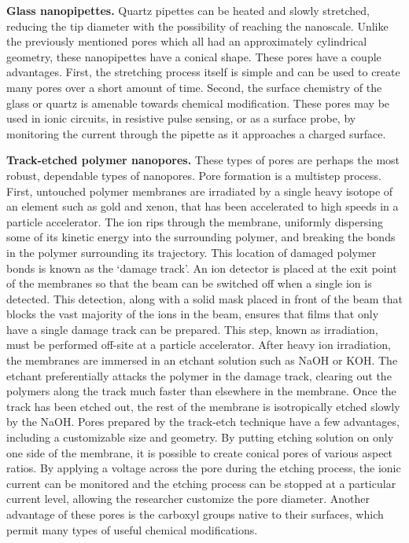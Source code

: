 			\textbf{Glass nanopipettes.} Quartz pipettes can be heated and slowly stretched, reducing the tip diameter with the possibility of reaching the nanoscale. Unlike the previously mentioned pores which all had an approximately cylindrical geometry, these nanopipettes have a conical shape. These pores have a couple advantages. First, the stretching process itself is simple and can be used to create many pores over a short amount of time. Second, the surface chemistry of the glass or quartz is amenable towards chemical modification. These pores may be used in ionic circuits, in resistive pulse sensing, or as a surface probe, by monitoring the current through the pipette as it approaches a charged surface.

			\textbf{Track-etched polymer nanopores.} These types of pores are perhaps the most robust, dependable types of nanopores. Pore formation is a multistep process. First, untouched polymer membranes are irradiated by a single heavy isotope of an element such as gold and xenon, that has been accelerated to high speeds in a particle accelerator. The ion rips through the membrane, uniformly dispersing some of its kinetic energy into the surrounding polymer, and breaking the bonds in the polymer surrounding its trajectory. This location of damaged polymer bonds is known as the `damage track'. An ion detector is placed at the exit point of the membranes so that the beam can be switched off when a single ion is detected. This detection, along with a solid mask placed in front of the beam that blocks the vast majority of the ions in the beam, ensures that films that only have a single damage track can be prepared. This step, known as irradiation, must be performed off-site at a particle accelerator. After heavy ion irradiation, the membranes are immersed in an etchant solution such as NaOH or KOH. The etchant preferentially attacks the polymer in the damage track, clearing out the polymers along the track much faster than elsewhere in the membrane. Once the track has been etched out, the rest of the membrane is isotropically etched slowly by the NaOH. Pores prepared by the track-etch technique have a few advantages, including a customizable size and geometry. By putting etching solution on only one side of the membrane, it is possible to create conical pores of various aspect ratios. By applying a voltage across the pore during the etching process, the ionic current can be monitored and the etching process can be stopped at a particular current level, allowing the researcher customize the pore diameter. Another advantage of these pores is the carboxyl groups native to their surfaces, which permit many types of useful chemical modifications.

